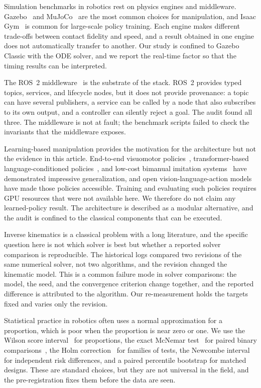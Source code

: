 \documentclass[journal]{IEEEtran}
\begin{document}
Simulation benchmarks in robotics rest on physics engines and middleware. Gazebo~\cite{koenig2004gazebo} and MuJoCo~\cite{todorov2012mujoco} are the most common choices for manipulation, and Isaac Gym~\cite{makoviychuk2021isaac} is common for large-scale policy training. Each engine makes different trade-offs between contact fidelity and speed, and a result obtained in one engine does not automatically transfer to another. Our study is confined to Gazebo Classic with the ODE solver, and we report the real-time factor so that the timing results can be interpreted.

The ROS~2 middleware~\cite{macenski2022ros2} is the substrate of the stack. ROS~2 provides typed topics, services, and lifecycle nodes, but it does not provide provenance: a topic can have several publishers, a service can be called by a node that also subscribes to its own output, and a controller can silently reject a goal. The audit found all three. The middleware is not at fault; the benchmark scripts failed to check the invariants that the middleware exposes.

Learning-based manipulation provides the motivation for the architecture but not the evidence in this article. End-to-end visuomotor policies~\cite{levine2016end}, transformer-based language-conditioned policies~\cite{brohan2023rt1}, and low-cost bimanual imitation systems~\cite{zhao2023aloha} have demonstrated impressive generalization, and open vision-language-action models~\cite{kim2024openvla} have made those policies accessible. Training and evaluating such policies requires GPU resources that were not available here. We therefore do not claim any learned-policy result. The architecture is described as a modular alternative, and the audit is confined to the classical components that can be executed.

Inverse kinematics is a classical problem with a long literature, and the specific question here is not which solver is best but whether a reported solver comparison is reproducible. The historical logs compared two revisions of the same numerical solver, not two algorithms, and the revision changed the kinematic model. This is a common failure mode in solver comparisons: the model, the seed, and the convergence criterion change together, and the reported difference is attributed to the algorithm. Our re-measurement holds the targets fixed and varies only the revision.

Statistical practice in robotics often uses a normal approximation for a proportion, which is poor when the proportion is near zero or one. We use the Wilson score interval~\cite{wilson1927probable} for proportions, the exact McNemar test~\cite{mcnemar1947note} for paired binary comparisons~\cite{dietterich1998approximate}, the Holm correction~\cite{holm1979simple} for families of tests, the Newcombe interval~\cite{newcombe1998interval} for independent risk differences, and a paired percentile bootstrap for matched designs. These are standard choices, but they are not universal in the field, and the pre-registration fixes them before the data are seen.
\end{document}
